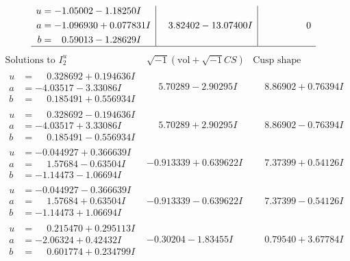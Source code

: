 \documentclass[1p]{elsarticle_modified}
\theoremstyle{definition}
\newcommand{\I}{\sqrt{-1}}
\begin{document}
$$\begin{array}{c|c|c}
\begin{aligned}
u &= -1.05002 - 1.18250 I \\
a &= -1.096930 + 0.077831 I \\
b &= \phantom{-}0.59013 - 1.28629 I\end{aligned}
 & \phantom{-}3.82402 - 13.07400 I & \phantom{-0.000000 } 0\\
 \hline 
 \end{array}$$\newpage$$\begin{array}{c|c|c}  
\text{Solutions to }I^u_{2}& \I (\text{vol} + \sqrt{-1}CS) & \text{Cusp shape}\\
 \hline 
\begin{aligned}
u &= \phantom{-}0.328692 + 0.194636 I \\
a &= -4.03517 - 3.33086 I \\
b &= \phantom{-}0.185491 + 0.556934 I\end{aligned}
 & \phantom{-}5.70289 - 2.90295 I & \phantom{-}8.86902 + 0.76394 I \\ \hline\begin{aligned}
u &= \phantom{-}0.328692 - 0.194636 I \\
a &= -4.03517 + 3.33086 I \\
b &= \phantom{-}0.185491 - 0.556934 I\end{aligned}
 & \phantom{-}5.70289 + 2.90295 I & \phantom{-}8.86902 - 0.76394 I \\ \hline\begin{aligned}
u &= -0.044927 + 0.366639 I \\
a &= \phantom{-}1.57684 - 0.63504 I \\
b &= -1.14473 - 1.06694 I\end{aligned}
 & -0.913339 + 0.639622 I & \phantom{-}7.37399 + 0.54126 I \\ \hline\begin{aligned}
u &= -0.044927 - 0.366639 I \\
a &= \phantom{-}1.57684 + 0.63504 I \\
b &= -1.14473 + 1.06694 I\end{aligned}
 & -0.913339 - 0.639622 I & \phantom{-}7.37399 - 0.54126 I \\ \hline\begin{aligned}
u &= \phantom{-}0.215470 + 0.295113 I \\
a &= -2.06324 + 0.42432 I \\
b &= \phantom{-}0.601774 + 0.234799 I\end{aligned}
 & -0.30204 - 1.83455 I & \phantom{-}0.79540 + 3.67784 I \\ \hline\begin{aligned}

\end{aligned}
\end{array}$$
\end{document}

